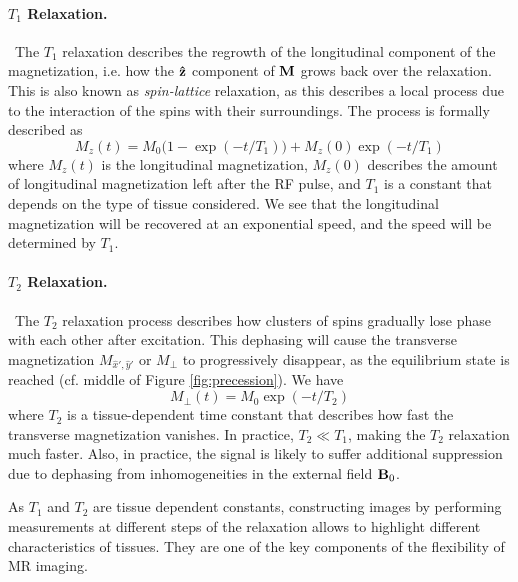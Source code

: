 
\paragraph{$T_1$ Relaxation.}~The $T_1$ relaxation describes the regrowth of the longitudinal component of the magnetization, i.e. how the $\mathbf{\hat{z}}$ component of $\mathbf{M}$ grows back over the relaxation. This is also known as \textit{spin-lattice} relaxation, as this describes a local process due to the interaction of the spins with their surroundings. The process is formally described as 
\begin{equation}
    M_z(t) = M_0\big(1-\exp\left(-t/T_1\right)\big) + M_z\left(0\right)\exp\left(-t/T_1\right)
\end{equation}
where $M_z(t)$ is the longitudinal magnetization, $M_z(0)$ describes the amount of longitudinal magnetization left after the RF pulse, and $T_1$ is a constant that depends on the type of tissue considered. We see that the longitudinal magnetization will be recovered at an exponential speed, and the speed will be determined by $T_1$.

\paragraph{$T_2$ Relaxation.}~The $T_2$ relaxation process describes how clusters of spins gradually lose phase with each other after excitation. This dephasing will cause the transverse magnetization $M_{\hat{x}',\hat{y}'}$ or $M_{\perp}$ to progressively disappear, as the equilibrium state is reached (cf. middle of Figure \ref{fig:precession}). We have
\begin{equation}
    M_{\perp}(t) = M_0\exp\left(-t/T_2\right)
\end{equation}
where $T_2$ is a tissue-dependent time constant that describes how fast the transverse magnetization vanishes. In practice, $T_2 \ll T_1$, making the $T_2$ relaxation much faster. Also, in practice, the signal is likely to suffer additional suppression due to dephasing from inhomogeneities in the external field $\mathbf{B}_0$.

As $T_1$ and $T_2$ are tissue dependent constants, constructing images by performing measurements at different steps of the relaxation allows to highlight different characteristics of tissues. They are one of the key components of the flexibility of MR imaging. 




